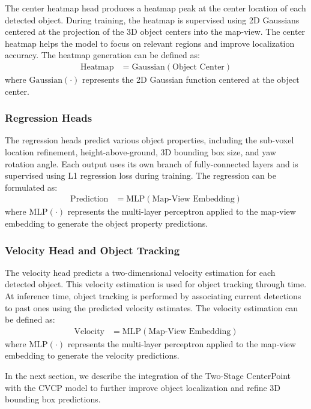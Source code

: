 \documentclass[times, report, parskip, openbib, twocolumn]{article}
\begin{document}
The center heatmap head produces a heatmap peak at the center location of each detected object. During training, the heatmap is supervised using 2D Gaussians centered at the projection of the 3D object centers into the map-view. The center heatmap helps the model to focus on relevant regions and improve localization accuracy. The heatmap generation can be defined as:
\begin{align}
    \text{Heatmap} &= \text{Gaussian}(\text{Object Center})
\end{align}
where $\text{Gaussian}(\cdot)$ represents the 2D Gaussian function centered at the object center.

\subsubsection{Regression Heads}
\label{subsubsec:regression_heads}

The regression heads predict various object properties, including the sub-voxel location refinement, height-above-ground, 3D bounding box size, and yaw rotation angle. Each output uses its own branch of fully-connected layers and is supervised using L1 regression loss during training. The regression can be formulated as:
\begin{align}
    \text{Prediction} &= \text{MLP}(\text{Map-View Embedding})
\end{align}
where $\text{MLP}(\cdot)$ represents the multi-layer perceptron applied to the map-view embedding to generate the object property predictions.

\subsubsection{Velocity Head and Object Tracking}
\label{subsubsec:velocity_head_object_tracking}

The velocity head predicts a two-dimensional velocity estimation for each detected object. This velocity estimation is used for object tracking through time. At inference time, object tracking is performed by associating current detections to past ones using the predicted velocity estimates. The velocity estimation can be defined as:
\begin{align}
    \text{Velocity} &= \text{MLP}(\text{Map-View Embedding})
\end{align}
where $\text{MLP}(\cdot)$ represents the multi-layer perceptron applied to the map-view embedding to generate the velocity predictions.

In the next section, we describe the integration of the Two-Stage CenterPoint with the CVCP model to further improve object localization and refine 3D bounding box predictions.
\end{document}
